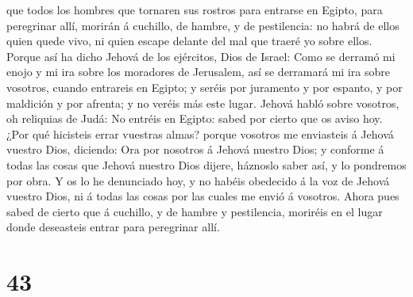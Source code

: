 que todos los hombres que tornaren sus rostros para entrarse en Egipto,
para peregrinar allí, morirán á cuchillo, de hambre, y de pestilencia:
no habrá de ellos quien quede vivo, ni quien escape delante del mal que
traeré yo sobre ellos.  Porque así ha dicho Jehová de los
ejércitos, Dios de Israel: Como se derramó mi enojo y mi ira sobre los
moradores de Jerusalem, así se derramará mi ira sobre vosotros, cuando
entrareis en Egipto; y seréis por juramento y por espanto, y por
maldición y por afrenta; y no veréis más este lugar. 
Jehová habló sobre vosotros, oh reliquias de Judá: No entréis en Egipto:
sabed por cierto que os aviso hoy.  ¿Por qué hicisteis
errar vuestras almas? porque vosotros me enviasteis á Jehová vuestro
Dios, diciendo: Ora por nosotros á Jehová nuestro Dios; y conforme á
todas las cosas que Jehová nuestro Dios dijere, háznoslo saber así, y lo
pondremos por obra.  Y os lo he denunciado hoy, y no
habéis obedecido á la voz de Jehová vuestro Dios, ni á todas las cosas
por las cuales me envió á vosotros.  Ahora pues sabed de
cierto que á cuchillo, y de hambre y pestilencia, moriréis en el lugar
donde deseasteis entrar para peregrinar allí.

\hypertarget{section-42}{%
\section{43}\label{section-42}}

